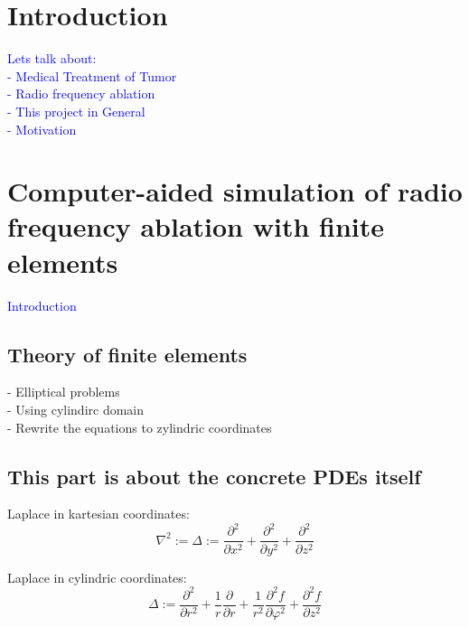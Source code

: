 \documentclass[parskip=half, titlepage=yes, 12pt, BCOR=12mm, DIV=calc]{scrartcl}
\begin{document}
\maketitle
\tableofcontents
\listoffigures
\listoftables
\lstlistoflistings
\clearpage



\section{Introduction}

\textcolor{blue}{Lets talk about:\\
- Medical Treatment of Tumor\\
- Radio frequency ablation\\
- This project in General\\
- Motivation
}


\section{Computer-aided simulation of radio frequency ablation with finite elements}

\textcolor{blue}
{
Introduction
}

\subsection{Theory of finite elements}

- Elliptical problems \\
- Using cylindirc domain \\
- Rewrite the equations to zylindric coordinates \\
 

\subsection{This part is about the concrete PDEs itself}


Laplace in kartesian coordinates:
\begin{equation}
    \nabla^2 := \Delta := \frac{\partial^2}{\partial x^2} + \frac{\partial^2}{\partial y^2} + \frac{\partial^2}{\partial z^2}
\end{equation}

Laplace in cylindric coordinates:
\begin{equation}
    \Delta := \frac{\partial^2}{\partial r^2} + \frac{1}{r} \frac{\partial}{\partial r} + \frac{1}{r^2} \frac{\partial^2 f}{\partial \varphi^2} + \frac{\partial^2 f}{\partial z^2}
\end{equation}
\end{document}
